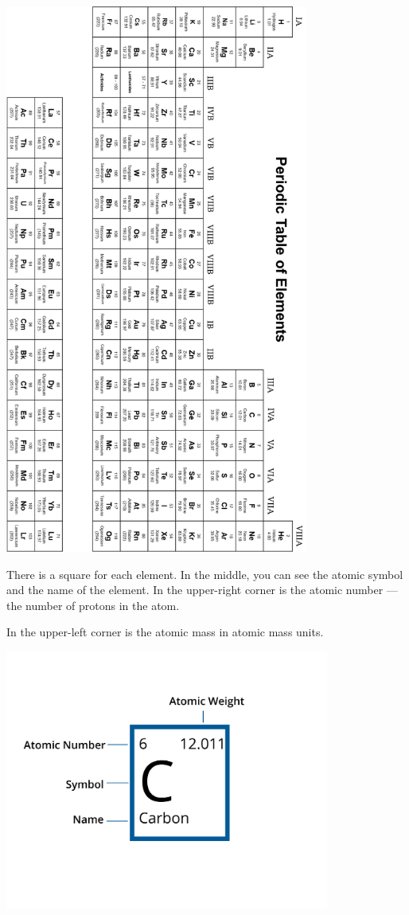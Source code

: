 \includegraphics[width=0.75\textwidth]{periodic.png}


\pagebreak
There is a square for each element. In the middle, you can see the atomic
symbol and the name of the element. In the upper-right corner is the
atomic number --- the number of protons in the atom.

In the upper-left corner is the atomic mass in atomic mass units.

\includegraphics[width=0.8\textwidth]{element.png}

